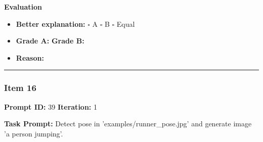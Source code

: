 \documentclass[11pt]{article}
\begin{document}
\vspace{1em}

\textbf{Evaluation}
\begin{itemize}
    \item \textbf{Better explanation:} \hspace{1em} $\square$ A \hspace{1em} $\square$ B \hspace{1em} $\square$ Equal
    \item \textbf{Grade A:} \underline{\hspace{2cm}} \hspace{1em} \textbf{Grade B:} \underline{\hspace{2cm}}
    \item \textbf{Reason:} \\[4.5em]
\end{itemize}

\vspace{1em}
\hrule
\vspace{1em}


\subsubsection*{Item 16}
\textbf{Prompt ID:} 39 \hfill \textbf{Iteration:} 1

\textbf{Task Prompt:} Detect pose in 'examples/runner\_pose.jpg' and generate image 'a person jumping'.
\end{document}
